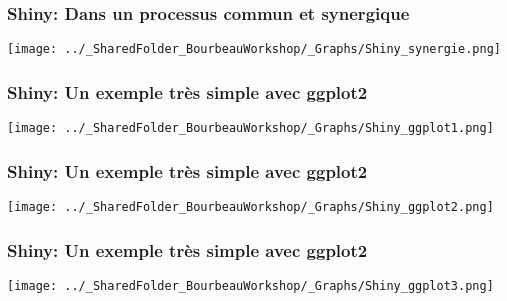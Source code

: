 \documentclass{beamer}
\begin{document}

    \begin{frame}
    
      \frametitle{Shiny: Dans un processus commun et synergique} \vspace{1cm}
      
        \begin{center}
      	  \texttt{[image: ../\_SharedFolder\_BourbeauWorkshop/\_Graphs/Shiny\_synergie.png]}
        \end{center} 
      
          
    \end{frame}  
    

    \begin{frame}
    
      \frametitle{Shiny: Un exemple très simple avec ggplot2} \vspace{1cm}
      
        \begin{center}
      	  \texttt{[image: ../\_SharedFolder\_BourbeauWorkshop/\_Graphs/Shiny\_ggplot1.png]}
        \end{center} 
      
          
    \end{frame} 
    

    \begin{frame}
    
      \frametitle{Shiny: Un exemple très simple avec ggplot2} \vspace{1cm}
      
        \begin{center}
      	  \texttt{[image: ../\_SharedFolder\_BourbeauWorkshop/\_Graphs/Shiny\_ggplot2.png]}
        \end{center} 
      
          
    \end{frame} 
    

    \begin{frame}
    
      \frametitle{Shiny: Un exemple très simple avec ggplot2} \vspace{1cm}
      
        \begin{center}
      	  \texttt{[image: ../\_SharedFolder\_BourbeauWorkshop/\_Graphs/Shiny\_ggplot3.png]}
        \end{center} 
      
          
    \end{frame} 
    
\end{document}
